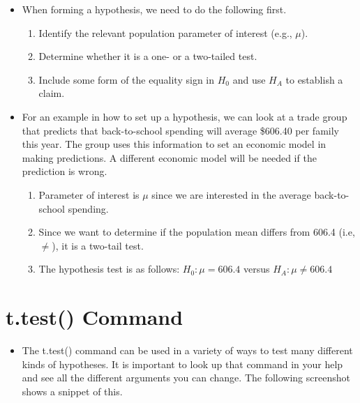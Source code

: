 \documentclass[
  letterpaper,
  DIV=11,
  numbers=noendperiod]{scrreprt}
\providecommand{\tightlist}{%
  \setlength{\itemsep}{0pt}\setlength{\parskip}{0pt}}\usepackage{longtable,booktabs,array}
\begin{document}
\begin{itemize}
\tightlist
\item
  When forming a hypothesis, we need to do the following first.

  \begin{enumerate}
  \def\labelenumi{\arabic{enumi}.}
  \tightlist
  \item
    Identify the relevant population parameter of interest (e.g.,
    \(\mu\)).
  \item
    Determine whether it is a one- or a two-tailed test.
  \item
    Include some form of the equality sign in \(H_0\) and use \(H_A\) to
    establish a claim.
  \end{enumerate}
\item
  For an example in how to set up a hypothesis, we can look at a trade
  group that predicts that back-to-school spending will average \$606.40
  per family this year. The group uses this information to set an
  economic model in making predictions. A different economic model will
  be needed if the prediction is wrong.

  \begin{enumerate}
  \def\labelenumi{\arabic{enumi}.}
  \tightlist
  \item
    Parameter of interest is \(\mu\) since we are interested in the
    average back-to-school spending.
  \item
    Since we want to determine if the population mean differs from 606.4
    (i.e, \(\neq\)), it is a two-tail test.
  \item
    The hypothesis test is as follows: \(H_0: \mu = 606.4\) versus
    \(H_A: \mu \neq 606.4\)
  \end{enumerate}
\end{itemize}


\chapter{t.test() Command}\label{t.test-command}

\begin{itemize}
\tightlist
\item
  The t.test() command can be used in a variety of ways to test many
  different kinds of hypotheses. It is important to look up that command
  in your help and see all the different arguments you can change. The
  following screenshot shows a snippet of this.
\end{itemize}
\end{document}
